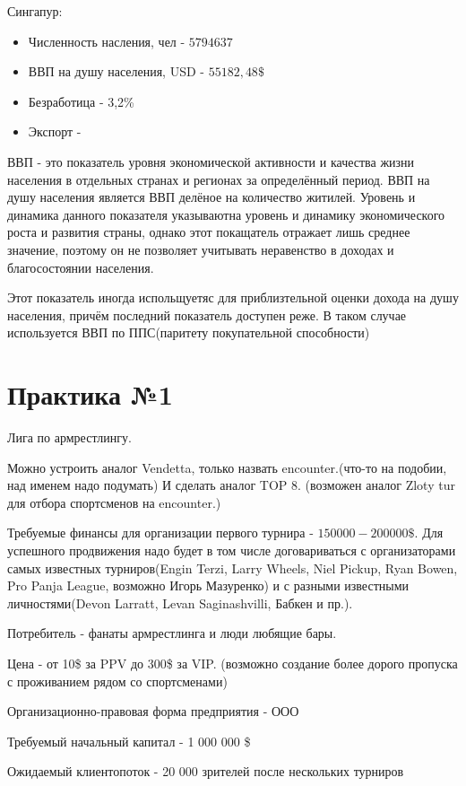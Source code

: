 \documentclass[a4paper, 12pt]{article}
\begin{document}
	Сингапур:
	\begin{itemize}
		\item Численность насления, чел - $5 794 637$
		\item ВВП на душу населения, USD - $55 182,48\$$
		\item Безработица - 3,2\%
		\item Экспорт - 
	\end{itemize}

	ВВП - это показатель уровня экономической активности и качества жизни населения в отдельных странах и регионах за определённый период. ВВП на душу населения является ВВП делёное на количество житилей. Уровень и динамика данного показателя указываютна уровень и динамику экономического роста и развития страны, однако этот покащатель отражает лишь среднее значение, поэтому он не позволяет учитывать неравенство в доходах и благосостоянии населения.
	
	Этот показатель иногда испольщуетяс для приблизтельной оценки дохода на душу населения, причём последний показатель доступен реже. В таком случае используется ВВП по ППС(паритету покупательной способности)
	
	
	\part*{Практика №1}
	
	Лига по армрестлингу. 
	
	Можно устроить аналог Vendetta, только назвать encounter.(что-то на подобии, над именем надо подумать) И сделать аналог TOP 8. (возможен аналог Zloty tur для отбора спортсменов на encounter.)
	
	Требуемые финансы для организации первого турнира - $150 000 - 200 000 \$$. Для успешного продвижения надо будет в том числе договариваться с организаторами самых известных турниров(Engin Terzi, Larry Wheels, Niel Pickup, Ryan Bowen, Pro Panja League, возможно Игорь Мазуренко) и с разными известными личностями(Devon Larratt, Levan Saginashvilli, Бабкен и пр.). 
	
	Потребитель - фанаты армрестлинга и люди любящие бары.
	
	Цена - от 10\$ за PPV до 300\$ за VIP. (возможно создание более дорого пропуска с проживанием рядом со спортсменами)
	
	Организационно-правовая форма предприятия - ООО
	
	Требуемый начальный капитал - 1 000 000 \$
	
	Ожидаемый клиентопоток - 20 000 зрителей после нескольких турниров
	
\end{document}
